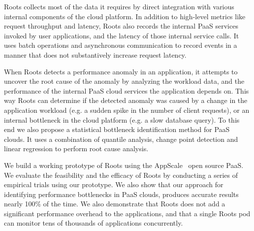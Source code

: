 Roots collects most of the data it requires by direct integration with various internal components 
of the cloud platform. In addition to high-level metrics like request throughput
and latency, Roots also records the internal PaaS services invoked by user applications,
and the latency of those internal service calls. It uses batch operations and asynchronous 
communication to record events in a manner that does not substantively
increase request latency.

When Roots detects a performance anomaly in an application, it attempts to uncover the
root cause of the anomaly by analyzing the workload data,
and the performance of the internal PaaS cloud services the application depends on. 
This way Roots can determine if the detected anomaly was caused by a change in the
application workload (e.g. a sudden spike in the number of client requests), or an internal
bottleneck in the cloud platform (e.g. a slow database query). To this end we also propose
a statistical bottleneck identification method for PaaS clouds. 
It uses a combination of quantile analysis, change point detection
and linear regression to perform root cause analysis. 

We build a working prototype of 
Roots using the AppScale~\cite{6488671} open source PaaS. We evaluate the feasibility and the 
efficacy of Roots by conducting a series of empirical trials using our prototype. 
We also show that our approach for identifying performance bottlenecks
in PaaS clouds, produces accurate results nearly 100\% of the time. 
We also demonstrate that Roots does not add a significant performance overhead
to the applications, and that a single Roots pod can monitor tens of thousands
of applications concurrently.

